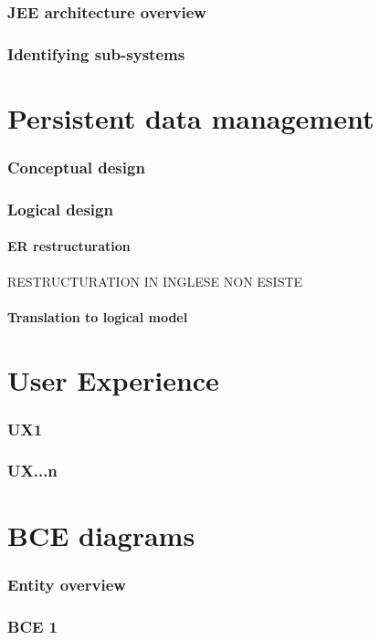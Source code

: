 \documentclass[10pt,a4paper,titlepage]{article}
\begin{document}
\section{JEE architecture overview}
\section{Identifying sub-systems}

\clearpage
\part{Persistent data management}
\section{Conceptual design}
\section{Logical design}
\subsection{ER restructuration}
RESTRUCTURATION IN INGLESE NON ESISTE
\subsection{Translation to logical model}

\clearpage
\part{User Experience}
\section{UX1}
\section{UX...n}

\clearpage
\part{BCE diagrams}
\section{Entity overview}
\section{BCE 1}
\end{document}
